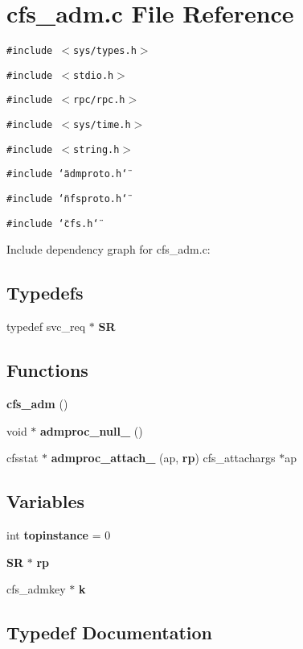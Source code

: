 \section{cfs\_\-adm.c File Reference}
\label{cfs__adm_8c}


{\tt \#include $<$sys/types.h$>$}\par
{\tt \#include $<$stdio.h$>$}\par
{\tt \#include $<$rpc/rpc.h$>$}\par
{\tt \#include $<$sys/time.h$>$}\par
{\tt \#include $<$string.h$>$}\par
{\tt \#include \char`\"{}admproto.h\char`\"{}}\par
{\tt \#include \char`\"{}nfsproto.h\char`\"{}}\par
{\tt \#include \char`\"{}cfs.h\char`\"{}}\par


Include dependency graph for cfs\_\-adm.c:\subsection*{Typedefs}
\begin{CompactItemize}
\item 
typedef svc\_\-req $\ast$ {\bf SR}
\end{CompactItemize}
\subsection*{Functions}
\begin{CompactItemize}
\item 
{\bf cfs\_\-adm} ()
\item 
void $\ast$ {\bf admproc\_\-null\_} ()
\item 
cfsstat $\ast$ {\bf admproc\_\-attach\_} (ap, {\bf rp}) cfs\_\-attachargs $\ast$ap
\end{CompactItemize}
\subsection*{Variables}
\begin{CompactItemize}
\item 
int {\bf topinstance} = 0
\item 
{\bf SR} $\ast$ {\bf rp}
\item 
cfs\_\-admkey $\ast$ {\bf k}
\end{CompactItemize}


\subsection{Typedef Documentation}

